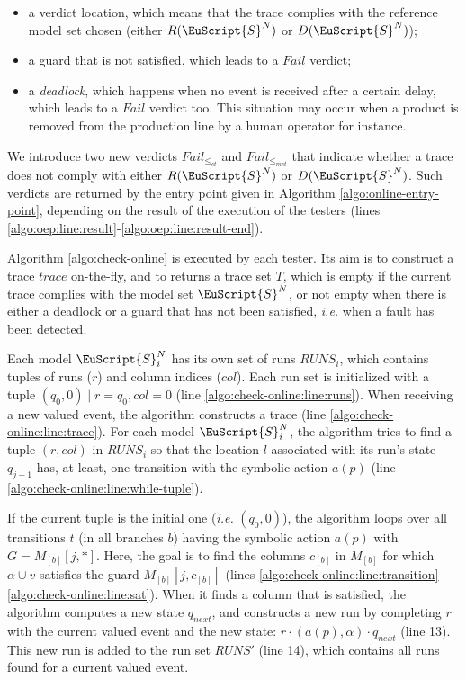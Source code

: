 \begin{itemize}
    \item a verdict location, which means that the trace complies
        with the reference model set chosen (either
        $R(\EuScript{S}^N)$ or $D(\EuScript{S}^N)$);

    \item a guard that is not satisfied, which leads to a $Fail$
        verdict;

    \item a \emph{deadlock}, which happens when no event is
        received after a certain delay, which leads to a $Fail$
        verdict too. This situation may occur when a product is
        removed from the production line by a human operator for
        instance.
\end{itemize}

We introduce two new verdicts $Fail_{\leq_{ct}}$ and
$Fail_{\leq_{mct}}$ that indicate whether a trace does not comply
with either $R(\EuScript{S}^N)$ or $D(\EuScript{S}^N)$. Such
verdicts are returned by the entry point given in Algorithm
\ref{algo:online-entry-point}, depending on the result of the
execution of the testers (lines
\ref{algo:oep:line:result}-\ref{algo:oep:line:result-end}).

Algorithm \ref{algo:check-online} is executed by each tester. Its
aim is to construct a trace $trace$ on-the-fly, and to returns a
trace set $T$, which is empty if the current trace complies with
the model set $\EuScript{S}^N$, or not empty when there is either
a deadlock or a guard that has not been satisfied, \emph{i.e.}
when a fault has been detected.

Each model $\EuScript{S}_i^N$ has its own set of runs $RUNS_i$,
which contains tuples of runs ($r$) and column indices ($col$).
Each run set is initialized with a tuple $(q_0, 0) \mid r = q_0,
col = 0$ (line \ref{algo:check-online:line:runs}). When receiving
a new valued event, the algorithm constructs a trace (line
\ref{algo:check-online:line:trace}). For each model
$\EuScript{S}_i^N$, the algorithm tries to find a tuple $(r,
col)$ in $RUNS_i$ so that the location $l$ associated with its
run's state $q_{j - 1}$ has, at least, one transition with the
symbolic action $a(p)$ (line
\ref{algo:check-online:line:while-tuple}).

If the current tuple is the initial one (\emph{i.e.} $(q_0, 0)$),
the algorithm loops over all transitions $t$ (in all branches
$b$) having the symbolic action $a(p)$ with $G = M_{[b]}[j, *]$.
Here, the goal is to find the columns $c_{[b]}$ in $M_{[b]}$ for
which $\alpha \cup v$ satisfies the guard $M_{[b]}[j, c_{[b]}]$
(lines
\ref{algo:check-online:line:transition}-\ref{algo:check-online:line:sat}).
When it finds a column that is satisfied, the algorithm computes
a new state $q_{next}$, and constructs a new run by completing
$r$ with the current valued event and the new state: $r \cdot
(a(p), \alpha) \cdot q_{next}$ (line 13). This new run is added
to the run set $RUNS'$ (line 14), which contains all runs found
for a current valued event.

